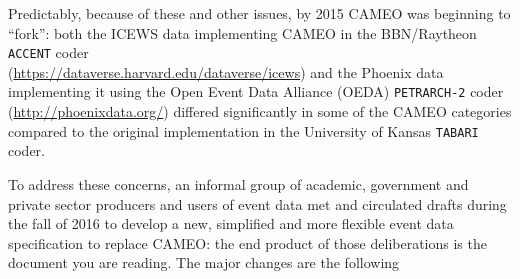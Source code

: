\documentclass[11pt]{report}
\newcommand{\txt}[1]{\texttt{#1}}
\begin{document}
Predictably, because of these and other issues, by 2015 CAMEO was beginning to ``fork'': both the ICEWS data implementing CAMEO in the BBN/Raytheon \txt{ACCENT} coder \\ (\url{https://dataverse.harvard.edu/dataverse/icews}) and the Phoenix data implementing it using the Open Event Data Alliance (OEDA) \txt{PETRARCH-2} coder  (\url{http://phoenixdata.org/}) differed significantly in some of the CAMEO categories compared to the original implementation in the University of Kansas \txt{TABARI} coder. 

To address these concerns, an informal group of academic, government and private sector producers and users of event data met and circulated drafts during the fall of 2016 to develop a new, simplified and more flexible event data specification to replace CAMEO: the end product of those deliberations is the document you are reading. The major changes are the following
\end{document}
